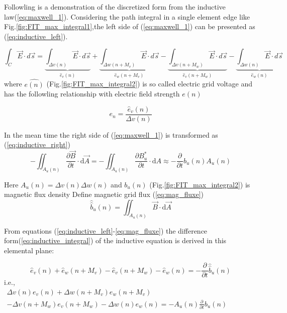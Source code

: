 Followling is a demonstration of the discretized form from the  inductive law(\ref{eq:maxwell_1}). Considering the path integral in a single element edge like Fig.\ref{fig:FIT_max_integral1},the left side of (\ref{eq:maxwell_1}) can be presented as (\ref{eq:inductive_left}). 

\begin{equation}
\int_{C}\vec{E}\cdot d\vec{s}
=\underbrace{\int_{\Delta v(n)}\vec{E}\cdot d\vec{s}}_{\widehat{e}_{v}(n)}
+\underbrace{\int_{\Delta w(n+M_{v})}\vec{E}\cdot d\vec{s}}_{\widehat{e}_{w}(n+M_{v})}
-\underbrace{\int_{\Delta v(n+M_{w})}\vec{E}\cdot d\vec{s}}_{\widehat{e}_{v}(n+M_{w})}
-\underbrace{\int_{\Delta w(n)}\vec{E}\cdot d\vec{s}}_{\widehat{e}_{w}(n)}
\label{eq:inductive_left}
\end{equation}
where $\widehat{e(n)}$ (Fig.\ref{fig:FIT_max_integral2}) is so called  electric grid voltage and has the followling relationship with electric field strength $e(n)$


\begin{equation}
e_{n}=\frac{\widehat{e}_{v}(n)}{\Delta v(n)}
\label{eq:e_field}
\end{equation}

In the mean time the right side of (\ref{eq:maxwell_1}) is transformed as (\ref{eq:inductive_right})
\begin{equation}
-\iint_{A_{u}(n)}\frac{\partial\vec{B}}{\partial t}\cdot\mathrm{d}\vec{A} 
=-\iint_{A_{u}(n)}\frac{\partial B^{*}_{u}}{\partial t}\cdot\mathrm{d}A
\approx -\frac{\partial}{\partial t}b_{u}(n)A_{u}(n)
\label{eq:inductive_right}
\end{equation}

Here $A_{u}(n)=\Delta v(n)\Delta w(n)$ and $b_{u}(n)$ (Fig.\ref{fig:FIT_max_integral2}) is magnetic flux density
Define magnetic grid flux (\ref{eq:mag_fluxe})
\begin{equation}
\widehat{\widehat{b}}_{u}(n)=\iint_{A_{u}(n)}\vec{B}\cdot\mathrm{d}\vec{A}
\label{eq:mag_fluxe}
\end{equation}

From equations (\ref{eq:inductive_left}-\ref{eq:mag_fluxe}) the difference form(\ref{eq:inductive_integral}) of the inductive equation is derived in this elemental plane:

\begin{equation}
\widehat{e}_{v}(n)+\widehat{e}_{w}(n+M_{v})-\widehat{e}_{v}(n+M_{w})-\widehat{e}_{w}(n)=-\frac{\partial}{\partial t}\widehat{\widehat{b}}_{u}(n)
\label{eq:inductive_integral}
\end{equation}
i.e.,
\begin{multline}
\Delta v(n)e_{v}(n)+\Delta w(n+M_{v})e_{w}(n+M_{v})\\
-\Delta v(n+M_{w})e_{v}(n+M_{w})-\Delta w(n)e_{w}(n)=-A_{u}(n)\frac{\partial}{\partial{t}}b_{u}(n) \hspace{5cm}
\label{eq:inductive_sample}
\end{multline}

